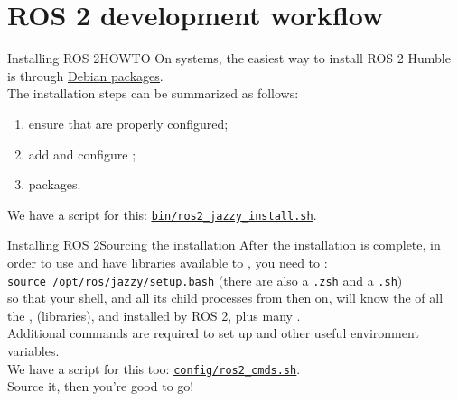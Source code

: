 
\section{ROS 2 development workflow}
\graphicspath{{figs/section1/}}

\begin{frame}{Installing ROS 2}{HOWTO}
  On  systems, the easiest way to install ROS 2 Humble is through \href{https://docs.ros.org/en/humble/Installation/Ubuntu-Install-Debians.html}{\color{blue}\underline{Debian packages}}.\\
  \bigskip
  The installation steps can be summarized as follows:
  \begin{enumerate}
    \item ensure that  are properly configured;
    \item add and configure ;
    \item {} packages.
  \end{enumerate}
  We have a script for this: \href{https://github.com/IntelligentSystemsLabUTV/ros2-examples/blob/humble/bin/ros2_jazzy_install.sh}{\color{blue}\underline{\texttt{bin/ros2\_jazzy\_install.sh}}}.
\end{frame}
\begin{frame}{Installing ROS 2}{Sourcing the installation}
  After the installation is complete, in order to use  and have libraries available to , you need to :\\
  \bigskip
  \texttt{source /opt/ros/jazzy/setup.bash} (there are also a \texttt{.zsh} and a \texttt{.sh})\\
  \bigskip
  so that your shell, and all its child processes from then on, will know the  of all the ,  (libraries), and  installed by ROS 2, plus many .\\
  \bigskip
  Additional commands are required to set up  and other useful environment variables.\\
  We have a script for this too: \href{https://github.com/IntelligentSystemsLabUTV/ros2-examples/blob/humble/config/ros2_cmds.sh}{\color{blue}\underline{\texttt{config/ros2\_cmds.sh}}}.\\
  Source it, then you're good to go!
\end{frame}

